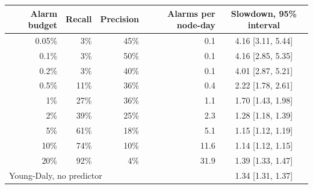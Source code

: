 \begin{tabular}{rrrrc}
\toprule
Alarm budget & Recall & Precision & Alarms per node-day & Slowdown, 95\% interval \\
\midrule
0.05\% & 3\% & 45\% & 0.1 & 4.16 [3.11, 5.44] \\
0.1\% & 3\% & 50\% & 0.1 & 4.16 [2.85, 5.35] \\
0.2\% & 3\% & 40\% & 0.1 & 4.01 [2.87, 5.21] \\
0.5\% & 11\% & 36\% & 0.4 & 2.22 [1.78, 2.61] \\
1\% & 27\% & 36\% & 1.1 & 1.70 [1.43, 1.98] \\
2\% & 39\% & 25\% & 2.3 & 1.28 [1.18, 1.39] \\
5\% & 61\% & 18\% & 5.1 & 1.15 [1.12, 1.19] \\
10\% & 74\% & 10\% & 11.6 & 1.14 [1.12, 1.15] \\
20\% & 92\% & 4\% & 31.9 & 1.39 [1.33, 1.47] \\
\midrule
\multicolumn{4}{l}{Young-Daly, no predictor} & 1.34 [1.31, 1.37] \\
\bottomrule
\end{tabular}
